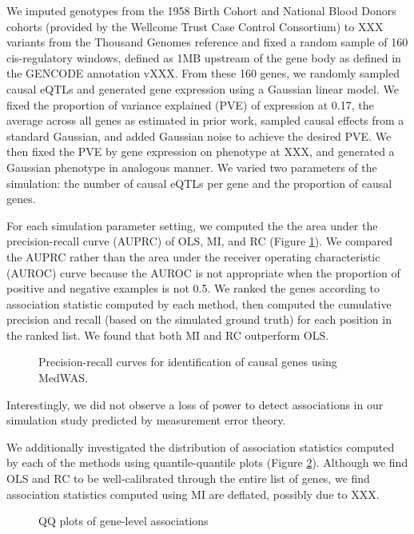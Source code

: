 \documentclass{article}
\begin{document}
We imputed genotypes from the 1958 Birth Cohort and National Blood Donors
cohorts (provided by the Wellcome Trust Case Control Consortium) to XXX
variants from the Thousand Genomes reference and fixed a random sample of 160
cis-regulatory windows, defined as 1MB upstream of the gene body as defined in
the GENCODE annotation vXXX. From these 160 genes, we randomly sampled causal
eQTLs and generated gene expression using a Gaussian linear model. We fixed the
proportion of variance explained (PVE) of expression at 0.17, the average
across all genes as estimated in prior
work\cite{10.1038/ng.3367,10.1038/ng.3506}, sampled causal effects from a
standard Gaussian, and added Gaussian noise to achieve the desired PVE. We then
fixed the PVE by gene expression on phenotype at XXX, and generated a Gaussian
phenotype in analogous manner. We varied two parameters of the simulation: the
number of causal eQTLs per gene and the proportion of causal genes.

For each simulation parameter setting, we computed the the area under the
precision-recall curve (AUPRC) of OLS, MI, and RC (Figure \ref{auprc}). We
compared the AUPRC rather than the area under the receiver operating
characteristic (AUROC) curve because the AUROC is not appropriate when the
proportion of positive and negative examples is not 0.5. We ranked the genes
according to association statistic computed by each method, then computed the
cumulative precision and recall (based on the simulated ground truth) for each
position in the ranked list. We found that both MI and RC outperform OLS.

\begin{figure}[p!]
  \caption{Precision-recall curves for identification of causal genes using
    MedWAS.}
  \label{auprc}
\end{figure}

Interestingly, we did not observe a loss of power to detect associations in our
simulation study predicted by measurement error theory.

We additionally investigated the distribution of association statistics
computed by each of the methods using quantile-quantile plots (Figure
\ref{qqplot}). Although we find OLS and RC to be well-calibrated through the
entire list of genes, we find association statistics computed using MI are
deflated, possibly due to XXX.

\begin{figure}[p!]
  \caption{QQ plots of gene-level associations}
  \label{qqplot}
\end{figure}
\end{document}
